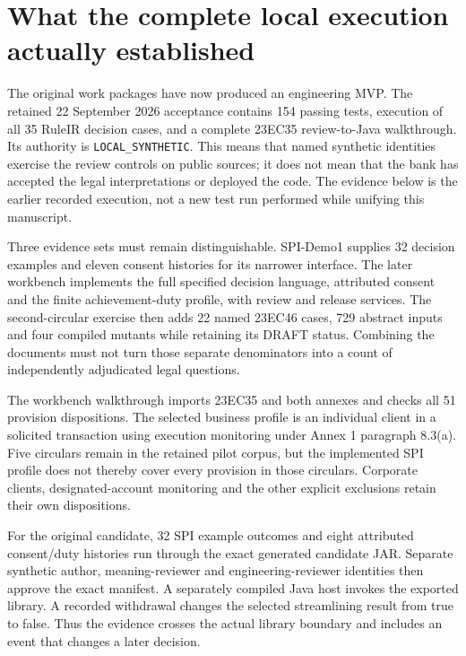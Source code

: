 \section{What the complete local execution actually established}
\label{sec:executed-workbench}

The original work packages have now produced an engineering MVP. The retained
22 September 2026 acceptance contains 154 passing tests, execution of all
35 RuleIR decision cases, and a complete 23EC35 review-to-Java walkthrough.
Its authority is \texttt{LOCAL\_SYNTHETIC}. This means that named synthetic
identities exercise the review controls on public sources; it does not mean
that the bank has accepted the legal interpretations or deployed the code.
The evidence below is the earlier recorded execution, not a new test run
performed while unifying this manuscript.

Three evidence sets must remain distinguishable. SPI-Demo1 supplies 32 decision
examples and eleven consent histories for its narrower interface. The later
workbench implements the full specified decision language, attributed consent
and the finite achievement-duty profile, with review and release services.
The second-circular exercise then adds 22 named 23EC46 cases, 729 abstract
inputs and four compiled mutants while retaining its DRAFT status. Combining
the documents must not turn those separate denominators into a count of
independently adjudicated legal questions.

The workbench walkthrough imports 23EC35 and both annexes and checks all
51 provision dispositions. The selected business profile is an individual
client in a solicited transaction using execution monitoring under Annex 1
paragraph 8.3(a). Five circulars remain in the retained pilot corpus, but the
implemented SPI profile does not thereby cover every provision in those
circulars. Corporate clients, designated-account monitoring and the other
explicit exclusions retain their own dispositions.

For the original candidate, 32 SPI example outcomes and eight attributed
consent/duty histories run through the exact generated candidate JAR.
Separate synthetic author, meaning-reviewer and engineering-reviewer identities
then approve the exact manifest. A separately compiled Java host invokes the
exported library. A recorded withdrawal changes the selected streamlining
result from true to false. Thus the evidence crosses the actual library
boundary and includes an event that changes a later decision.

